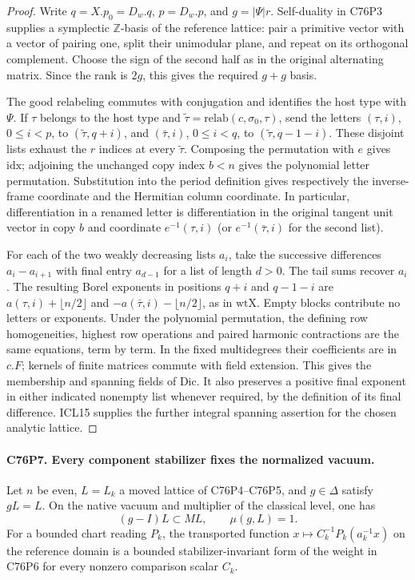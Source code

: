 \begin{proof}
Write $q=X.p_0=D_w.q$, $p=D_w.p$, and $g=|\Psi|r$.
Self-duality in C76P3 supplies a symplectic $\mathbb Z$-basis of
the reference lattice: pair a primitive vector with a vector of
pairing one, split their unimodular plane, and repeat on its
orthogonal complement. Choose the sign of the second half as in
the original alternating matrix. Since the rank is $2g$, this
gives the required $g+g$ basis.

The good relabeling commutes with conjugation and identifies the
host type with $\Psi$. If $\tau$ belongs to the host type and
$\tilde\tau=\mathrm{relab}(c,\sigma_0,\tau)$, send the letters
$(\tau,i)$, $0\le i<p$, to $(\tilde\tau,q+i)$, and
$(\bar\tau,i)$, $0\le i<q$, to $(\tilde\tau,q-1-i)$.
These disjoint lists exhaust the $r$ indices at every
$\tilde\tau$. Composing the permutation with $e$ gives
$\mathrm{idx}$; adjoining the unchanged copy index $b<n$
gives the polynomial letter permutation. Substitution into the
period definition gives respectively the inverse-frame coordinate
and the Hermitian column coordinate. In particular, differentiation
in a renamed letter is differentiation in the original tangent unit
vector in copy $b$ and coordinate $e^{-1}(\tau,i)$
(or $e^{-1}(\bar\tau,i)$ for the second list).

For each of the two weakly decreasing lists $a_i$, take the
successive differences $a_i-a_{i+1}$ with final entry $a_{d-1}$
for a list of length $d>0$. The tail sums recover $a_i$.
The resulting Borel exponents in positions $q+i$ and $q-1-i$
are $a(\tau,i)+\lfloor n/2\rfloor$ and
$-a(\bar\tau,i)-\lfloor n/2\rfloor$, as in $\mathrm{wtX}$.
Empty blocks contribute no letters or exponents. Under the
polynomial permutation, the defining row homogeneities, highest
row operations and paired harmonic contractions are the same
equations, term by term. In the fixed multidegrees their coefficients
are in $c.F$; kernels of finite matrices commute with field extension.
This gives the membership and spanning fields of $\mathrm{Dic}$.
It also preserves a positive final exponent in either indicated
nonempty list whenever required, by the definition of its final
difference. ICL15 supplies the further integral spanning assertion
for the chosen analytic lattice.
\end{proof}

\paragraph{C76P7. Every component stabilizer fixes the normalized vacuum.}
Let $n$ be even, $L=L_k$ a moved lattice of C76P4--C76P5,
and $g\in\Delta$ satisfy $gL=L$. On the native vacuum and
multiplier of the classical level, one has
\[
             (g-I)L\subset ML,\qquad \mu(g,L)=1 .
\]
For a bounded chart reading $P_k$, the transported function
$x\mapsto C_k^{-1}P_k(a_k^{-1}x)$ on the reference domain
is a bounded stabilizer-invariant form of the weight in C76P6
for every nonzero comparison scalar $C_k$.

